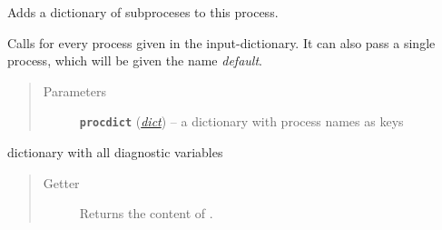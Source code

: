 \documentclass[letterpaper,10pt,english]{sphinxmanual}
\begin{document}
\begin{fulllineitems}
\begin{fulllineitems}
\end{fulllineitems}


\begin{fulllineitems}
\label{api/climlab.process:climlab.process.process.Process.add_subprocesses}
Adds a dictionary of subproceses to this process.

Calls {\hyperref[api/climlab.process:climlab.process.process.Process.add_subprocess]{\emph{}}} for every process given in the 
input-dictionary. It can also pass a single process, which will 
be given the name \emph{default}.
\begin{quote}\begin{description}
\item[{Parameters}] \leavevmode
\textbf{\texttt{procdict}} (\href{http://docs.python.org/2.7/library/stdtypes.html\#dict}{\emph{dict}}) -- a dictionary with process names as keys

\end{description}\end{quote}

\end{fulllineitems}


\begin{fulllineitems}
\label{api/climlab.process:climlab.process.process.Process.depth}
\end{fulllineitems}


\begin{fulllineitems}
\label{api/climlab.process:climlab.process.process.Process.depth_bounds}
\end{fulllineitems}


\begin{fulllineitems}
\label{api/climlab.process:climlab.process.process.Process.diagnostics}
dictionary with all diagnostic variables
\begin{quote}\begin{description}
\item[{Getter}] \leavevmode
Returns the content of .


\end{description}
\end{quote}
\end{fulllineitems}
\end{fulllineitems}
\end{document}
